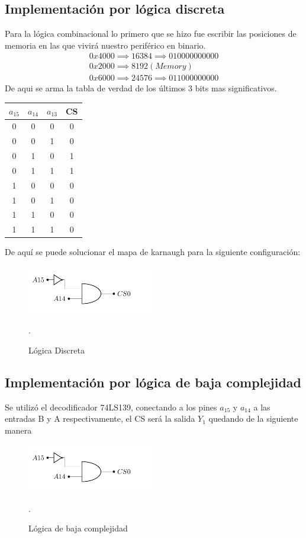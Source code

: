 


\subsection{Implementación por lógica discreta}
Para la lógica combinacional lo primero que se hizo fue escribir las posiciones de memoria en las que vivirá nuestro periférico en binario.
\begin{align}
0x4000 \implies 16384 \implies 0100 0000 0000\\
0x2000 \implies 8192(Memory)\\
0x6000 \implies 24576 \implies 011000000000 
\end{align}
De aqui se arma la tabla de verdad de los últimos 3 bits mas significativos.
\begin{table}[H]
\centering
\begin{tabular}{cccc}
$a_{15}$ & $a_{14}$ & \multicolumn{1}{c|}{$a_{13}$} & CS \\ \hline
0 & 0 & 0 & 0 \\
0 & 0 & 1 & 0 \\
0 & 1 & 0 & 1 \\
0 & 1 & 1 & 1 \\
1 & 0 & 0 & 0 \\
1 & 0 & 1 & 0 \\
1 & 1 & 0 & 0 \\
1 & 1 & 1 & 0
\end{tabular}
\label{tab:truetab}
\end{table}
De aquí se puede solucionar el mapa de karnaugh para la siguiente configuración:
\begin{figure}[H]
  \centering
  \includegraphics[width=0.5\textwidth,page = 1]{ImagenesEjercicio1/Circuits.pdf}
  \caption{Lógica Discreta}.
  \label{fig:circLog}
\end{figure}
\subsection{Implementación por lógica de baja complejidad}
Se utilizó el decodificador 74LS139, conectando a los pines $a_{15}$ y $a_{14}$ a las entradas B y A respectivamente, el CS será la salida $Y_1$ quedando de la siguiente manera
\begin{figure}[H]
  \centering
  \includegraphics[width=0.5\textwidth,page = 2]{ImagenesEjercicio1/Circuits.pdf}
  \caption{Lógica de baja complejidad}.
  \label{fig:circdec}
\end{figure}
